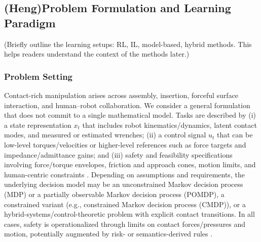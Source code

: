 \documentclass[Afour,sageh,times]{template/sagej}
\newcommand{\suggest}[1]{{\color{olive} (#1)}}
\begin{document}


\subsection{\suggest{Heng}Problem Formulation and Learning Paradigm}
\suggest{Briefly outline the learning setups: RL, IL, model-based, hybrid methods. This helps readers understand the context of the methods later.}
\subsubsection{Problem Setting}
Contact-rich manipulation arises across assembly, insertion, forceful surface interaction, and human–robot collaboration. We consider a general formulation that does not commit to a single mathematical model. Tasks are described by
(i) a state representation $x_t$ that includes robot kinematics/dynamics, latent contact modes, and measured or estimated wrenches;
(ii) a control signal $u_t$ that can be low-level torques/velocities or higher-level references such as force targets and impedance/admittance gains; and
(iii) safety and feasibility specifications involving force/torque envelopes, friction and approach cones, motion limits, and human-centric constraints \citep{ajoudani2018progress,calanca2015review,yuan2022safe}.
Depending on assumptions and requirements, the underlying decision model may be an unconstrained Markov decision process (MDP) or a partially observable Markov decision process (POMDP), a constrained variant (e.g.,  constrained Markov decision process (CMDP)), or a hybrid-systems/control-theoretic problem with explicit contact transitions. In all cases, safety is operationalized through limits on contact forces/pressures and motion, potentially augmented by risk- or semantics-derived rules \citep{yuan2022safe,33,100,330}.
\end{document}
